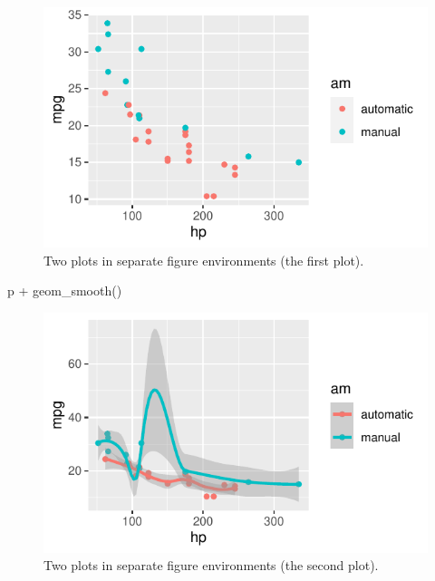 \documentclass[]{tufte-handout}
\newenvironment{Shaded}{}{}
\newcommand{\FunctionTok}[1]{\textcolor[rgb]{0.02,0.16,0.49}{#1}}
\newcommand{\NormalTok}[1]{#1}
\newcommand{\SpecialCharTok}[1]{\textcolor[rgb]{0.25,0.44,0.63}{#1}}
\begin{document}
\begin{figure}
\includegraphics{tufte_files/figure-latex/fig-two-separate-1} \caption[Two plots in separate figure environments (the first plot)]{Two plots in separate figure environments (the first plot).}\label{fig:fig-two-separate-1}
\end{figure}

\begin{Shaded}
\begin{Highlighting}[]
\NormalTok{p }\SpecialCharTok{+} \FunctionTok{geom\_smooth}\NormalTok{()}
\end{Highlighting}
\end{Shaded}

\begin{figure}
\includegraphics{tufte_files/figure-latex/fig-two-separate-2} \caption[Two plots in separate figure environments (the second plot)]{Two plots in separate figure environments (the second plot).}\label{fig:fig-two-separate-2}
\end{figure}
\end{document}
